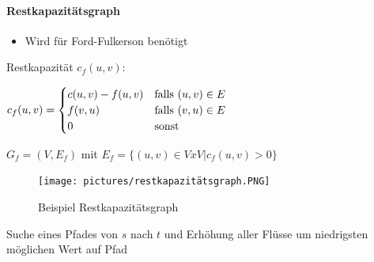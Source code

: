 \documentclass[
    ngerman,
    color=3b,
    dark_mode,
    load_common, %
    summary,
    boxarc,
]{tuda_summary}
\begin{document}
\clearpage
\paragraph{Restkapazitätsgraph}
\begin{itemize}
    \item Wird für Ford-Fulkerson benötigt
\end{itemize}
Restkapazität $c_f(u,v)$: \\
\centerline{$c_f(u,v) = \begin{cases}\hiderowcolors
            c(u,v) - f(u,v) & \text{falls $(u,v) \in E$} \\
            f(v,u)          & \text{falls $(v,u) \in E$} \\
            0               & \text{sonst}
        \end{cases}$}
$G_f = (V, E_f)$ mit $E_f = \{(u,v) \in V x V | c_f(u,v) > 0 \}$
\begin{figure}[h]
    \centering
    \texttt{[image: pictures/restkapazitätsgraph.PNG]}
    \caption{Beispiel Restkapazitätsgraph}
\end{figure}
Suche eines Pfades von $s$ nach $t$ und Erhöhung aller Flüsse um niedrigsten möglichen Wert auf Pfad
\end{document}
